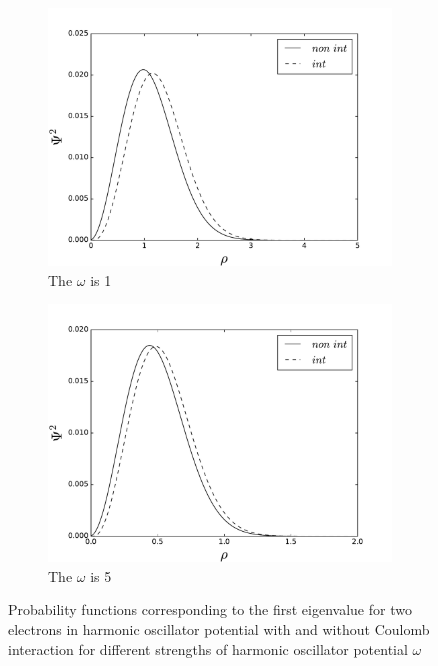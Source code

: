 \documentclass[10pt]{article}
\begin{document}
\begin{figure}[h!]
  \begin{subfigure}[b]{0.6\linewidth}
    \centering
    \includegraphics[width=1.1\linewidth]{two_nint_1} 
    \caption{The $\omega$ is 1} 
    \label{fig2:c} 
  \end{subfigure}%
  \begin{subfigure}[b]{0.6\linewidth}
    \centering
    \includegraphics[width=1.1\linewidth]{two_nint_5} 
    \caption{The $\omega$ is 5} 
    \label{fig2:d} 
  \end{subfigure} 
  \caption{ Probability functions corresponding to the first eigenvalue for two electrons in harmonic oscillator potential with and without Coulomb interaction for different strengths of harmonic oscillator potential $\omega$}
  \label{fig2} 
\end{figure}
\end{document}

